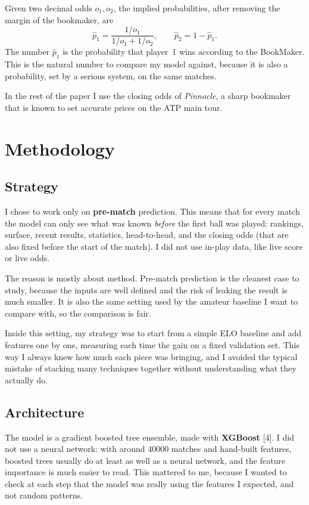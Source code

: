 \documentclass[10pt,twocolumn]{article}
\begin{document}
Given two decimal odds \(o_1, o_2\), the implied probabilities, after
removing the margin of the bookmaker, are
\begin{equation}
  \hat{p}_1 = \frac{1/o_1}{1/o_1 + 1/o_2}, \qquad
  \hat{p}_2 = 1 - \hat{p}_1.
\end{equation}
The number \(\hat{p}_1\) is the probability that player~1 wins according to
the BookMaker. This is the natural number to compare my model against,
because it is also a probability, set by a serious system, on the same
matches.

In the rest of the paper I use the closing odds of \textit{Pinnacle},
a sharp bookmaker that is known to set accurate prices on the ATP main
tour.

\section{Methodology}

\subsection{Strategy}
I chose to work only on \textbf{pre-match} prediction. This means that for
every match the model can only see what was known \emph{before} the first
ball was played: rankings, surface, recent results, statistics,
head-to-head, and the closing odds (that are also fixed before the start
of the match). I did not use in-play data, like live score or live odds.

The reason is mostly about method. Pre-match prediction is the cleanest
case to study, because the inputs are well defined and the risk of
leaking the result is much smaller. It is also the same setting used by
the amateur baseline I want to compare with, so the comparison is fair.

Inside this setting, my strategy was to start from a simple ELO baseline
and add features one by one, measuring each time the gain on a fixed
validation set. This way I always knew how much each piece was bringing,
and I avoided the typical mistake of stacking many techniques together
without understanding what they actually do.

\subsection{Architecture}
The model is a gradient boosted tree ensemble, made with \textbf{XGBoost}
[4]. I did not use a neural network: with around \num{40000} matches and
hand-built features, boosted trees usually do at least as well as a neural
network, and the feature importance is much easier to read. This mattered
to me, because I wanted to check at each step that the model was really
using the features I expected, and not random patterns.
\end{document}
